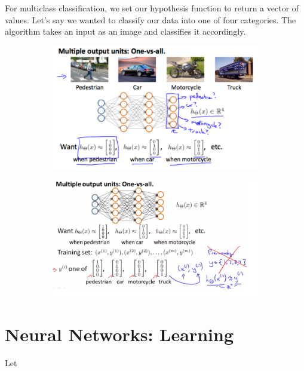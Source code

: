     \pagebreak

    \noindent For multiclass classification, we set our hypothesis function to return a vector of values.
    Let's say we wanted to classify our data into one of four categories. The algorithm takes an input as
    an image and classifies it accordingly.

    \begin{figure}[hbt!]
        \centering
        \begin{subfigure}[b]{.45\linewidth}
            \includegraphics[scale=0.5]{Resources/Multiclass_Nets.PNG}
        \end{subfigure}
        \begin{subfigure}[b]{.45\linewidth}
            \includegraphics[scale=0.5]{Resources/Multiclass_Nets2}
        \end{subfigure}
    \end{figure}


\pagebreak
\section{Neural Networks: Learning}
    Let

